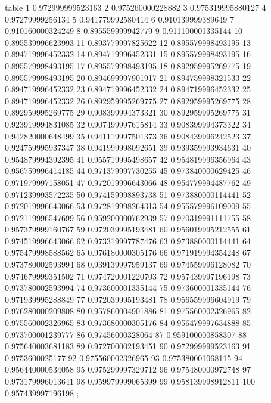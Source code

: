 table {%
	1 0.972999999523163
	2 0.975260000228882
	3 0.975319995880127
	4 0.97279999256134
	5 0.941779992580414
	6 0.910139999389649
	7 0.910160000324249
	8 0.895559999942779
	9 0.911100001335144
	10 0.895539996623993
	11 0.893779997825622
	12 0.895579998493195
	13 0.894719996452332
	14 0.894719996452331
	15 0.895579998493195
	16 0.895579998493195
	17 0.895579998493195
	18 0.892959995269775
	19 0.895579998493195
	20 0.894699997901917
	21 0.894759998321533
	22 0.894719996452332
	23 0.894719996452332
	24 0.894719996452332
	25 0.894719996452332
	26 0.892959995269775
	27 0.892959995269775
	28 0.892959995269775
	29 0.908399994373321
	30 0.892959995269775
	31 0.923919994831085
	32 0.907499997615814
	33 0.908399994373322
	34 0.942820000648499
	35 0.941119997501373
	36 0.908439996242523
	37 0.924759995937347
	38 0.941999998092651
	39 0.939359993934631
	40 0.954879994392395
	41 0.955719995498657
	42 0.954819996356964
	43 0.956759996414185
	44 0.971379997730255
	45 0.973840000629425
	46 0.971979997158051
	47 0.972019996643066
	48 0.954779994487762
	49 0.971239993572235
	50 0.974159998893738
	51 0.973880000114441
	52 0.972019996643066
	53 0.972819998264313
	54 0.955579996109009
	55 0.972119996547699
	56 0.959200000762939
	57 0.970319991111755
	58 0.957379999160767
	59 0.972039995193481
	60 0.956019995212555
	61 0.974519996643066
	62 0.973319997787476
	63 0.973880000114441
	64 0.975479998588562
	65 0.976180000305176
	66 0.971919994354248
	67 0.973780002593994
	68 0.939139997959137
	69 0.974559996128082
	70 0.974679999351502
	71 0.974720001220703
	72 0.957439997196198
	73 0.973780002593994
	74 0.973600001335144
	75 0.973600001335144
	76 0.971939995288849
	77 0.972039995193481
	78 0.956559996604919
	79 0.976280000209808
	80 0.957860004901886
	81 0.975560002326965
	82 0.975560002326965
	83 0.973680000305176
	84 0.956479997634888
	85 0.973700001239777
	86 0.97456000328064
	87 0.959100000858307
	88 0.975640003681183
	89 0.972700002193451
	90 0.972999999523163
	91 0.9753600025177
	92 0.975560002326965
	93 0.975380001068115
	94 0.956440000534058
	95 0.975299997329712
	96 0.975480000972748
	97 0.973179996013641
	98 0.959979999065399
	99 0.958139998912811
	100 0.957439997196198
};
